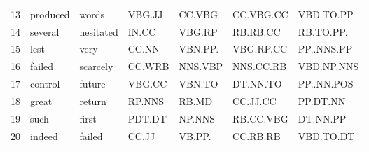 \documentclass[a4paper,10pt,twoside,fleqn]{article}
\begin{document}
\begin{table}[h!]
\begin{tabular}{lllllll}
13  &   produced  &      words  & VBG.JJ  &  CC.VBG  & CC.VBG.CC   & VBD.TO.PP. \\
14  &    several  &  hesitated  &  IN.CC  &  VBG.RP  &  RB.RB.CC   &  RB.TO.PP. \\
15  &       lest  &       very  &  CC.NN  & VBN.PP.  & VBG.RP.CC   & PP..NNS.PP \\
16  &     failed  &   scarcely  & CC.WRB  & NNS.VBP  & NNS.CC.RB   & VBD.NP.NNS \\
17  &    control  &     future  & VBG.CC  &  VBN.TO  &  DT.NN.TO   & PP..NN.POS \\
18  &      great  &     return  & RP.NNS  &   RB.MD  &  CC.JJ.CC   &   PP.DT.NN \\
19  &       such  &      first  & PDT.DT  &  NP.NNS  & RB.CC.VBG   &   DT.NN.PP \\
20  &     indeed  &     failed  &  CC.JJ  &  VB.PP.  &  CC.RB.RB   &  VBD.TO.DT \\
\bottomrule
\end{tabular}
\end{table}
\end{document}
